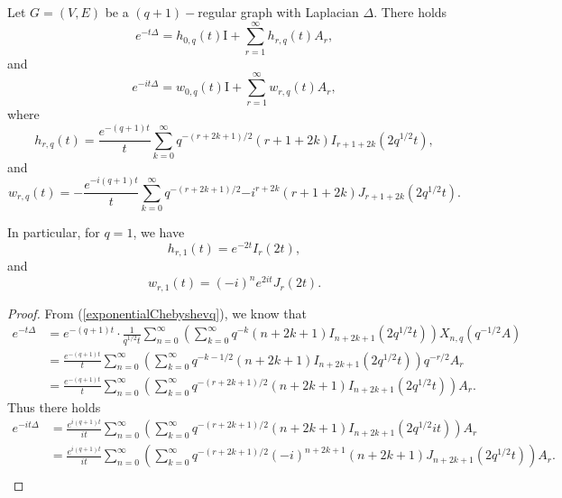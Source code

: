 \documentclass{article}
\begin{document}
\begin{proposition}\label{fdsolutionofheat}
Let $G=(V,E)$ be a $(q+1)-$regular graph with Laplacian $\Delta$. There holds 
\begin{equation}\label{heatkernelbound}
    e^{-t\Delta} =h_{0,q} (t)\mathrm{I} +\sum_{r=1}^{\infty} h_{r,q}(t)A_r,
\end{equation}
and
\begin{equation}
    e^{-it\Delta} =w_{0,q} (t)\mathrm{I} +\sum_{r=1}^{\infty} w_{r,q}(t)A_r,
\end{equation}
where
\begin{equation}\label{eq:heat}
    h_{r,q}(t)=\frac{e^{-(q+1)t}}{t}\sum_{k=0}^{\infty}
   q^{-(r+2k+1)/2}(r+1+2k)I_{r+1+2k}(2q^{1/2}t),
\end{equation}
and
\begin{equation}\label{wave}
    w_{r,q}(t)=-\frac{e^{-i(q+1)t}}{t}\sum_{k=0}^{\infty}
   q^{-(r+2k+1)/2}{-i}^{r+2k}(r+1+2k)J_{r+1+2k}(2q^{1/2}t).
\end{equation}
\end{proposition}
\begin{remark}\label{lattice1}
    In particular, for $q=1$, we have 
    $$h_{r,1}(t)=e^{-2t}I_r(2t),$$
    and
    $$w_{r,1}(t)=(-i)^ne^{2it}J_r(2t).$$
\end{remark}
\begin{proof}
    From (\ref{exponentialChebyshevq}), we know that
    \begin{equation*}
    \begin{aligned}
e^{-t\Delta}&=e^{-(q+1)t}\cdot \frac{1}{q^{1/2}t}\sum_{n=0}^{\infty}\left(\sum_{k=0}^{\infty}q^{-k}(n+2k+1)I_{n+2k+1}(2q^{1/2}t)\right) X_{n,q}(q^{-1/2}A)\\
&=\frac{e^{-(q+1)t}}{t}\sum_{n=0}^{\infty}\left(\sum_{k=0}^{\infty}q^{-k-1/2}(n+2k+1)I_{n+2k+1}(2q^{1/2}t)\right) q^{-r/2}A_r\\
&=\frac{e^{-(q+1)t}}{t}\sum_{n=0}^{\infty}\left(\sum_{k=0}^{\infty}q^{-(r+2k+1)/2}(n+2k+1)I_{n+2k+1}(2q^{1/2}t)\right) A_r.
\end{aligned}
\end{equation*}
Thus there holds
$$
\begin{aligned}
e^{-it\Delta}&=\frac{e^{i(q+1)t}}{it}\sum_{n=0}^{\infty}\left(\sum_{k=0}^{\infty}q^{-(r+2k+1)/2}(n+2k+1)I_{n+2k+1}(2q^{1/2}it)\right) A_r\\
&=\frac{e^{i(q+1)t}}{it}\sum_{n=0}^{\infty}\left(\sum_{k=0}^{\infty}q^{-(r+2k+1)/2}(-i)^{n+2k+1}(n+2k+1)J_{n+2k+1}(2q^{1/2}t)\right) A_r.\\
\end{aligned}
$$
\end{proof}
\end{document}
